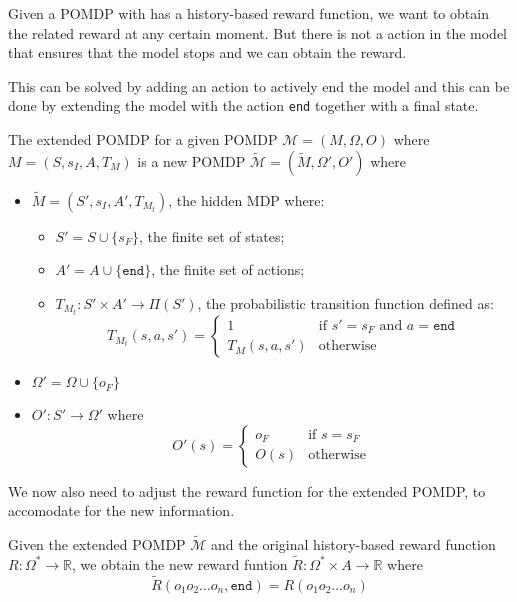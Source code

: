 Given a POMDP with has a history-based reward function, we want to obtain the related reward at any certain moment. But there is not a action in the model that ensures that the model stops and we can obtain the reward. 

This can be solved by adding an action to actively end the model and this can be done by extending the model with the action \texttt{end} together with a final state.

\begin{definition}
	The extended POMDP for a given POMDP $\mathcal{M}=(M,\Omega,O)$ where $M=(S,s_I,A,T_{M})$ is a new POMDP $\widetilde{\mathcal{M}} = (\widetilde{M},\Omega',O')$ where
		\begin{itemize}
		\item $\widetilde{M} = (S',s_I,A',T_{M_t})$, the hidden MDP where:
		\begin{itemize}
			\item $S'=S\cup \{s_F\}$, the finite set of states;
			\item $A'=A\cup \{\texttt{end}\}$, the finite set of actions;
			\item $T_{M_t}:S'\times A' \to \Pi(S')$, the probabilistic transition function defined as:
			\[ T_{M_t}(s,a,s') = \begin{cases}
						1 & \text{if } s'=s_F \text{ and } a = \texttt{end}\\
						T_M(s,a,s') & \text{otherwise} 
					\end{cases} \]
		\end{itemize}
	\item $\Omega'= \Omega\cup \{o_F\}$
	\item $O' : S' \to \Omega'$ where 
		\[ O'(s) = \begin{cases}
			o_F & \text{if } s=s_F \\
			O(s) & \text{otherwise} 
			\end{cases} \]
	\end{itemize}
	\label{d:extended-pomdp}
\end{definition}

We now also need to adjust the reward function for the extended POMDP, to accomodate for the new information.
\begin{definition}
	\label{def:reward-mdp}
	Given the extended POMDP $\widetilde{\mathcal{M}}$ and the original history-based reward function $R:\Omega^*\to \mathbb{R}$, we obtain the new reward funtion $\widetilde{R}:\Omega^*\times A\to\mathbb{R}$  where 
	\[\widetilde{R}(o_1 o_2\dots o_n,\texttt{end}) = 
		R(o_1 o_2 \dots o_{n})\]
\end{definition}
